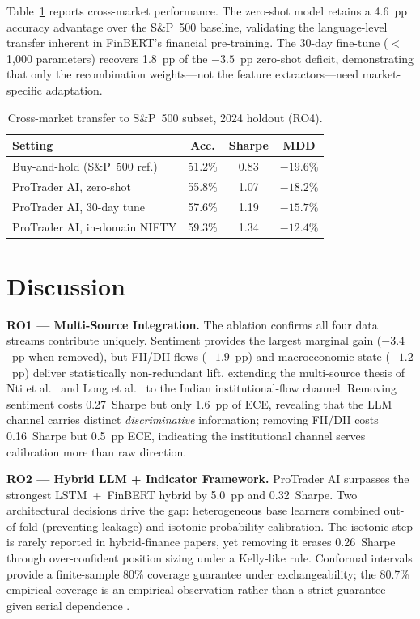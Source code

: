 \documentclass[12pt,a4paper]{article}
\begin{document}
Table~\ref{tab:transfer} reports cross-market performance. The zero-shot
model retains a 4.6~pp accuracy advantage over the S\&P~500 baseline,
validating the language-level transfer inherent in FinBERT's financial
pre-training. The 30-day fine-tune ($<$1{,}000 parameters) recovers 1.8~pp
of the $-3.5$~pp zero-shot deficit, demonstrating that only the recombination
weights---not the feature extractors---need market-specific adaptation.

\begin{table}[h]
\centering
\caption{Cross-market transfer to S\&P~500 subset, 2024 holdout (RO4).}
\label{tab:transfer}
\footnotesize
\begin{tabular}{lccc}
\toprule
\textbf{Setting} & \textbf{Acc.} & \textbf{Sharpe} & \textbf{MDD} \\
\midrule
Buy-and-hold (S\&P~500 ref.) & 51.2\% & 0.83 & $-19.6\%$ \\
ProTrader AI, zero-shot      & 55.8\% & 1.07 & $-18.2\%$ \\
ProTrader AI, 30-day tune    & 57.6\% & 1.19 & $-15.7\%$ \\
ProTrader AI, in-domain NIFTY & 59.3\% & 1.34 & $-12.4\%$ \\
\bottomrule
\end{tabular}
\end{table}

\section{Discussion}

\textbf{RO1 --- Multi-Source Integration.} The ablation confirms all four
data streams contribute uniquely. Sentiment provides the largest marginal gain
($-3.4$~pp when removed), but FII/DII flows ($-1.9$~pp) and macroeconomic state
($-1.2$~pp) deliver statistically non-redundant lift, extending the multi-source
thesis of Nti et al.\ \cite{r2} and Long et al.\ \cite{r3} to the Indian
institutional-flow channel. Removing sentiment costs 0.27~Sharpe but only 1.6~pp of ECE, revealing that
the LLM channel carries distinct \emph{discriminative} information; removing
FII/DII costs 0.16~Sharpe but 0.5~pp ECE, indicating the institutional channel
serves calibration more than raw direction.

\textbf{RO2 --- Hybrid LLM + Indicator Framework.} ProTrader AI surpasses the
strongest LSTM~+~FinBERT hybrid by 5.0~pp and 0.32~Sharpe. Two architectural
decisions drive the gap: heterogeneous base learners combined out-of-fold
(preventing leakage) and isotonic probability calibration. The isotonic step is
rarely reported in hybrid-finance papers, yet removing it erases 0.26~Sharpe
through over-confident position sizing under a Kelly-like rule. Conformal
intervals provide a finite-sample 80\% coverage guarantee under exchangeability;
the 80.7\% empirical coverage is an empirical observation rather than a strict
guarantee given serial dependence \cite{r27,r28}.
\end{document}
